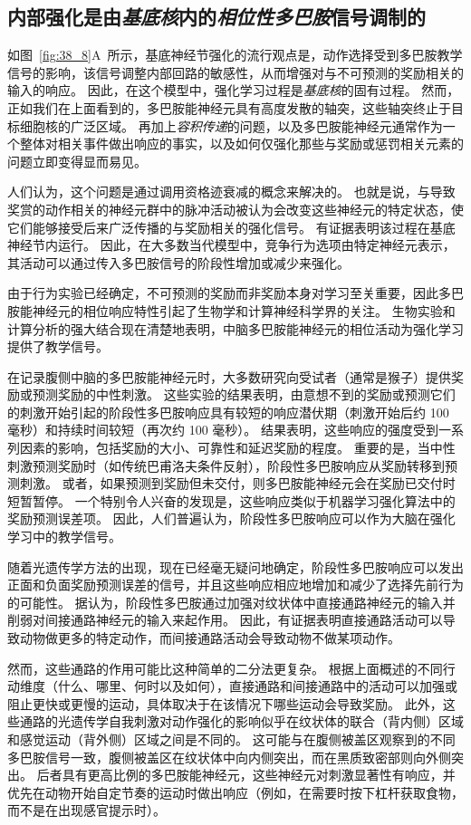 \subsection{内部强化是由\textit{基底核}内的\textit{相位性多巴胺}信号调制的}

如图~\ref{fig:38_8}A~所示，基底神经节强化的流行观点是，动作选择受到多巴胺教学信号的影响，该信号调整内部回路的敏感性，从而增强对与不可预测的奖励相关的输入的响应。
因此，在这个模型中，强化学习过程是\textit{基底核}的固有过程。
然而，正如我们在上面看到的，多巴胺能神经元具有高度发散的轴突，这些轴突终止于目标细胞核的广泛区域。
再加上\textit{容积传递}的问题，以及多巴胺能神经元通常作为一个整体对相关事件做出响应的事实，以及如何仅强化那些与奖励或惩罚相关元素的问题立即变得显而易见。


人们认为，这个问题是通过调用资格迹衰减的概念来解决的。
也就是说，与导致奖赏的动作相关的神经元群中的脉冲活动被认为会改变这些神经元的特定状态，使它们能够接受后来广泛传播的与奖励相关的强化信号。
有证据表明该过程在基底神经节内运行。
因此，在大多数当代模型中，竞争行为选项由特定神经元表示，其活动可以通过传入多巴胺信号的阶段性增加或减少来强化。


由于行为实验已经确定，不可预测的奖励而非奖励本身对学习至关重要，因此多巴胺能神经元的相位响应特性引起了生物学和计算神经科学界的关注。
生物实验和计算分析的强大结合现在清楚地表明，中脑多巴胺能神经元的相位活动为强化学习提供了教学信号。


在记录腹侧中脑的多巴胺能神经元时，大多数研究向受试者（通常是猴子）提供奖励或预测奖励的中性刺激。
这些实验的结果表明，由意想不到的奖励或预测它们的刺激开始引起的阶段性多巴胺响应具有较短的响应潜伏期（刺激开始后约 100 毫秒）和持续时间较短（再次约 100 毫秒）。
结果表明，这些响应的强度受到一系列因素的影响，包括奖励的大小、可靠性和延迟奖励的程度。
重要的是，当中性刺激预测奖励时（如传统巴甫洛夫条件反射），阶段性多巴胺响应从奖励转移到预测刺激。
或者，如果预测到奖励但未交付，则多巴胺能神经元会在奖励已交付时短暂暂停。
一个特别令人兴奋的发现是，这些响应类似于机器学习强化算法中的奖励预测误差项。
因此，人们普遍认为，阶段性多巴胺响应可以作为大脑在强化学习中的教学信号。


随着光遗传学方法的出现，现在已经毫无疑问地确定，阶段性多巴胺响应可以发出正面和负面奖励预测误差的信号，并且这些响应相应地增加和减少了选择先前行为的可能性。
据认为，阶段性多巴胺通过加强对纹状体中直接通路神经元的输入并削弱对间接通路神经元的输入来起作用。
因此，有证据表明直接通路活动可以导致动物做更多的特定动作，而间接通路活动会导致动物不做某项动作。


然而，这些通路的作用可能比这种简单的二分法更复杂。
根据上面概述的不同行动维度（什么、哪里、何时以及如何），直接通路和间接通路中的活动可以加强或阻止更快或更慢的运动，具体取决于在该情况下哪些运动会导致奖励。
此外，这些通路的光遗传学自我刺激对动作强化的影响似乎在纹状体的联合（背内侧）区域和感觉运动（背外侧）区域之间是不同的。
这可能与在腹侧被盖区观察到的不同多巴胺信号一致，腹侧被盖区在纹状体中向内侧突出，而在黑质致密部则向外侧突出。
后者具有更高比例的多巴胺能神经元，这些神经元对刺激显著性有响应，并优先在动物开始自定节奏的运动时做出响应（例如，在需要时按下杠杆获取食物，而不是在出现感官提示时）。


